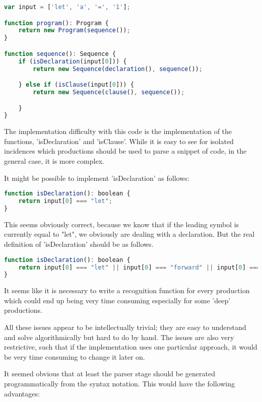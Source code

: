 \documentclass{article}
\begin{document}
\begin{lstlisting}[caption={TODO},label={lst:fixedclauseprod},language=javascript]
var input = ['let', 'a', '=', '1'];

function program(): Program {
	return new Program(sequence());
}

function sequence(): Sequence {
	if (isDeclaration(input[0])) {
		return new Sequence(declaration(), sequence());

	} else if (isClause(input[0])) {
		return new Sequence(clause(), sequence());

	}
}
\end{lstlisting}


The implementation difficulty with this code is the implementation of the functions, 'isDeclaration' and 'isClause'. While it is easy to see for isolated incidences which productions should be used to parse a snippet of code, in the general case, it is more complex.

It might be possible to implement 'isDeclaration' as follows:

\begin{lstlisting}[caption={TODO},label={lst:fixedclauseprod},language=javascript]
function isDeclaration(): boolean {
	return input[0] === "let";
}
\end{lstlisting}


This seems obviously correct, because we know that if the leading symbol is currently equal to "let", we obviously are dealing with a declaration. But the real definition of 'isDeclaration' should be as follows.

\begin{lstlisting}[caption={TODO},label={lst:fixedclauseprod},language=javascript]
function isDeclaration(): boolean {
	return input[0] === "let" || input[0] === "forward" || input[0] === "procedure" || input[0] === "let";
}
\end{lstlisting}


It seems like it is necessary to write a recognition function for every production which could end up being very time consuming especially for some 'deep' productions.

All these issues appear to be intellectually trivial; they are easy to understand and solve algorithmically but hard to do by hand. The issues are also very restrictive, such that if the implementation uses one particular approach, it would be very time consuming to change it later on.

It seemed obvious that at least the parser stage should be generated programmatically from the syntax notation. This would have the following advantages:
\end{document}
